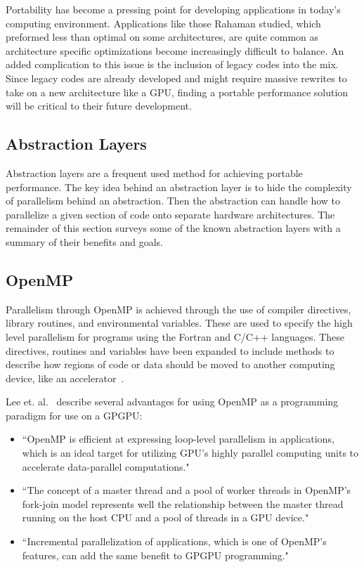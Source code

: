 Portability has become a pressing point for developing applications in today's computing environment.
%
Applications like those Rahaman studied, which preformed less than optimal on some architectures, are quite common as architecture specific optimizations become increasingly difficult to balance.
%
An added complication to this issue is the inclusion of legacy codes into the mix.
%
Since legacy codes are already developed and might require massive rewrites to take on a new architecture like a GPU, finding a portable performance solution will be critical to their future development.

\subsection{ \textbf{Abstraction Layers}}
\label{sec:abstractionLayers}

Abstraction layers are a frequent used method for achieving portable performance.
%
The key idea behind an abstraction layer is to hide the complexity of parallelism behind an abstraction.
%
Then the abstraction can handle how to parallelize a given section of code onto separate hardware architectures.
%
The remainder of this section surveys some of the known abstraction layers with a summary of their benefits and goals.

\subsection*{\textbf{OpenMP}}

Parallelism through OpenMP is achieved through the use of compiler directives, library routines, and environmental variables.
%
These are used to specify the high level parallelism for programs using the Fortran and C/C++ languages.
%
These directives, routines and variables have been expanded to include methods to describe how regions of code or data should be moved to another computing device, like an accelerator~\cite{openmp}.

Lee et. al.~\cite{lee2009openmp} describe several advantages for using OpenMP as a programming paradigm for use on a GPGPU:
\begin{itemize}
\item ``OpenMP is efficient at expressing loop-level parallelism in applications, which is an ideal target for utilizing GPU's highly parallel computing units to accelerate data-parallel computations."
\item ``The concept of a master thread and a pool of worker threads in OpenMP's fork-join model represents well the relationship between the master thread running on the host CPU and a pool of threads in a GPU device."
\item ``Incremental parallelization of applications, which is one of OpenMP's features, can add the same benefit to GPGPU programming."
\end{itemize}

